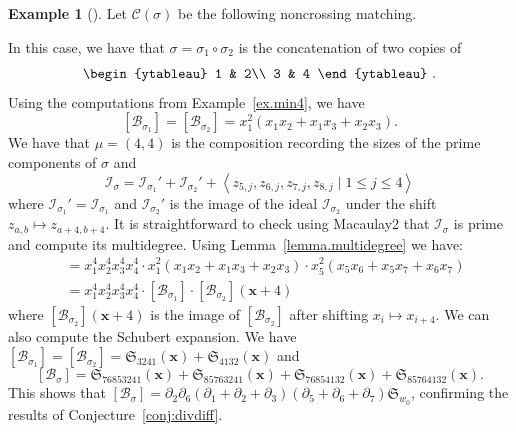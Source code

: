 \documentclass[11pt]{amsart}
\theoremstyle{remark}
\theoremstyle{remark}
\theoremstyle{definition}
\theoremstyle{definition}
\theoremstyle{definition}
\newtheorem{eg_no_qed}[theorem]{Example}
\newenvironment{ex}[1][]{\begin{eg_no_qed}[#1]\renewcommand{\qedsymbol}{$\Diamond$}\pushQED{\qed}}{\popQED\end{eg_no_qed}}
\numberwithin{equation}{section}
\newcommand{\gs}{\sigma}
\newcommand{\cb}{\mathcal{B}}
\newcommand{\cc}{\mathcal{C}}
\newcommand{\ci}{\mathcal{I}}
\newcommand{\SF}{\mathcal{B}}
\newcommand{\cupsigma}{\cc(\gs)}
\begin{document}
\begin{ex}\label{ex.copiesof2rainbow}
Let $\cupsigma$ be the following noncrossing matching.
\begin{figure}[h!]
\centering
{} 
\end{figure}

\noindent In this case, we have that $\gs=\gs_1\circ\gs_2$ is the concatenation of two copies of 
\[
\begin{ytableau} 1 & 2\\ 3 & 4
\end{ytableau} \ .
\]
Using the computations from Example~\ref{ex.min4}, we have 
\[
[\cb_{\gs_1}]=[\cb_{\gs_2}]= x_1^2 (x_1x_2+x_1x_3+x_2x_3).
\]
We have that $\mu=(4,4)$ is the composition recording the sizes of the prime components of $\gs$ and
\[
\ci_\gs =  \ci_{\gs_1}'+\ci_{\gs_2}' + \left\langle  z_{5,j}, z_{6,j}, z_{7,j}, z_{8,j} \mid 1\leq j \leq 4  \right\rangle 
\]
where $\ci_{\gs_1}'=\ci_{\gs_1}$ and $\ci_{\gs_2}'$ is the image of the ideal $\ci_{\gs_2}$ under the shift $z_{a,b}\mapsto z_{a+4, b+4}$. It is straightforward to check using Macaulay2 that $\ci_\gs$ is prime and compute its multidegree. Using Lemma~\ref{lemma.multidegree} we have:
\begin{align*}
[\SF_\gs] &= x_1^4x_2^4x_3^4x_4^4 \cdot x_1^2 (x_1x_2+x_1x_3+x_2x_3) \cdot x_5^2 (x_5x_6+x_5x_7+x_6x_7) \\
&= x_1^4x_2^4x_3^4x_4^4 \cdot [\SF_{\gs_1}] \cdot [\SF_{\gs_2}](\mathbf{x}+4)
\end{align*}
where $[\SF_{\gs_2}](\mathbf{x}+4)$ is the image of $[\SF_{\gs_2}]$ after shifting $x_i\mapsto x_{i+4}$. We can also compute the Schubert expansion.  We have $[\SF_{\gs_1}]=[\SF_{\gs_2}] = \mathfrak{S}_{3241}(\mathbf{x}) + \mathfrak{S}_{4132}(\mathbf{x})$ and 
\[
[\cb_\gs] = \mathfrak{S}_{76853241}(\mathbf{x})+\mathfrak{S}_{85763241}(\mathbf{x})+\mathfrak{S}_{76854132}(\mathbf{x})+\mathfrak{S}_{85764132}(\mathbf{x}).
\]
This shows that $[\cb_\gs] =  \partial_2 \partial _6(\partial_1+\partial_2+\partial_3)(\partial_5+\partial_6+\partial_7)\mathfrak{S}_{w_0}$, confirming the results of Conjecture~\ref{conj:divdiff}.
\end{ex}
\end{document}
